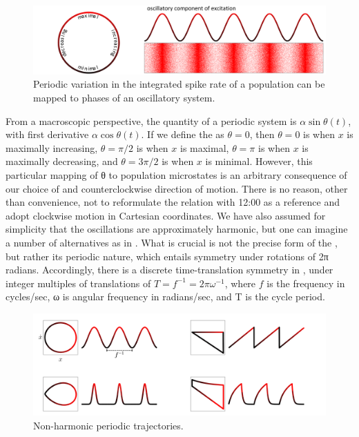   
\begin{figure}
\includegraphics[width=\textwidth]{figures/Tilsen-img46.png}
\caption{Periodic variation in the integrated spike rate of a population can be mapped to phases of an oscillatory system.}
\label{fig:3:18}
\end{figure}
 

  From a macroscopic perspective, the  quantity of a periodic system is {$\alpha \sin{θ(t)}$}, with first derivative {$\alpha \cos{θ(t)}$}. If we define the  as $θ = 0$, then $θ = 0$ is when $x$ is maximally increasing, $θ = π/2$ is when $x$ is maximal, $θ = π$ is when $x$ is maximally decreasing, and $θ = 3π/2$ is when $x$ is minimal. However, this particular mapping of θ to population microstates is an arbitrary consequence of our choice of  and counterclockwise direction of motion. There is no reason, other than convenience, not to reformulate the relation with 12:00 as a reference and adopt clockwise motion in Cartesian coordinates. We have also assumed for simplicity that the oscillations are approximately harmonic, but one can imagine a number of alternatives as in {}. What is crucial is not the precise form of the , but rather its periodic nature, which entails symmetry under rotations of 2π radians. Accordingly, there is a discrete time-translation symmetry in , under integer multiples of translations of $T = f^{-1} = 2\pi \omega^{-1}$, where $f$ is the frequency in cycles/sec, ω is angular frequency in radians/sec, and T is the cycle period.

  
\begin{figure}
\includegraphics[width=\textwidth]{figures/Tilsen-img47.png}
\caption{Non-harmonic periodic trajectories.}
\label{fig:3:19}
\end{figure}
 

